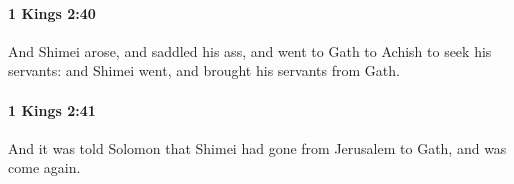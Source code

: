 		\paragraph{1 Kings 2:40} %
			\label{1KINGS-2-40}

			And Shimei arose, and saddled his ass, and went to Gath to Achish to seek his servants: and Shimei went, and brought his servants from Gath.


		\paragraph{1 Kings 2:41} %
			\label{1KINGS-2-41}

			And it was told Solomon that Shimei had gone from Jerusalem to Gath, and was come again.


